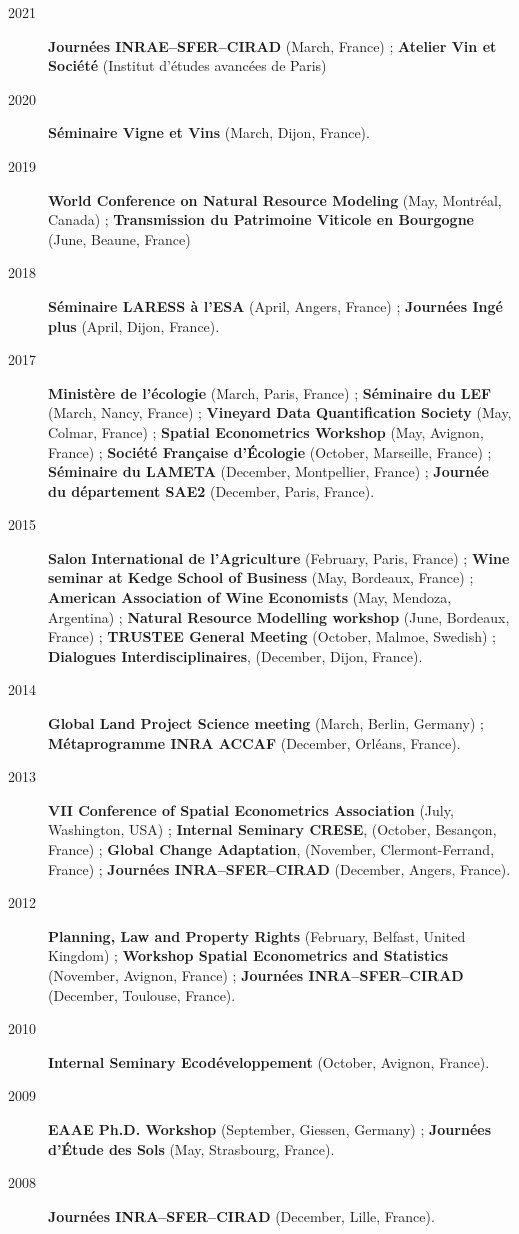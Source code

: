\documentclass[11pt, a4paper]{./style}
\begin{document}
\begin{description}
\item[{2021}] \textbf{Journées INRAE--SFER--CIRAD} (March, France) ; \textbf{Atelier
Vin et Société} (Institut d’études avancées de Paris)
\item[{2020}] \textbf{Séminaire Vigne et Vins} (March, Dijon, France).
\item[{2019}] \textbf{World Conference on Natural Resource Modeling} (May,
Montréal, Canada) ; \textbf{Transmission du Patrimoine Viticole
en Bourgogne} (June, Beaune, France)
\item[{2018}] \textbf{Séminaire LARESS à l'ESA} (April, Angers, France) ;
\textbf{Journées Ingé plus} (April, Dijon, France).
\item[{2017}] \textbf{Ministère de l'écologie} (March, Paris, France) ;
\textbf{Séminaire du LEF} (March, Nancy, France) ; \textbf{Vineyard Data
Quantification Society} (May, Colmar, France) ; \textbf{Spatial
Econometrics Workshop} (May, Avignon, France) ; \textbf{Société
Française d'Écologie} (October, Marseille, France) ;
\textbf{Séminaire du LAMETA} (December, Montpellier, France) ;
\textbf{Journée du département SAE2} (December, Paris, France).
\item[{2015}] \textbf{Salon International de l'Agriculture} (February, Paris,
France) ; \textbf{Wine seminar at Kedge School of Business} (May,
Bordeaux, France) ; \textbf{American Association of Wine
Economists} (May, Mendoza, Argentina) ; \textbf{Natural Resource
Modelling workshop} (June, Bordeaux, France) ; \textbf{TRUSTEE
General Meeting} (October, Malmoe, Swedish) ; \textbf{Dialogues
Interdisciplinaires}, (December, Dijon, France).
\item[{2014}] \textbf{Global Land Project Science meeting} (March, Berlin,
Germany) ; \textbf{Métaprogramme INRA ACCAF} (December, Orléans,
France).
\item[{2013}] \textbf{VII Conference of Spatial Econometrics Association}
(July, Washington, USA) ; \textbf{Internal Seminary CRESE},
(October, Besançon, France) ; \textbf{Global Change Adaptation},
(November, Clermont-Ferrand, France) ; \textbf{Journées
INRA--SFER--CIRAD} (December, Angers, France).
\item[{2012}] \textbf{Planning, Law and Property Rights} (February, Belfast,
United Kingdom) ; \textbf{Workshop Spatial Econometrics and
Statistics} (November, Avignon, France) ; \textbf{Journées
INRA--SFER--CIRAD} (December, Toulouse, France).
\item[{2010}] \textbf{Internal Seminary Ecodéveloppement} (October, Avignon,
France).
\item[{2009}] \textbf{EAAE Ph.D. Workshop} (September, Giessen, Germany) ;
\textbf{Journées d'Étude des Sols} (May, Strasbourg, France).
\item[{2008}] \textbf{Journées INRA--SFER--CIRAD} (December, Lille, France).
\end{description}
\end{document}
